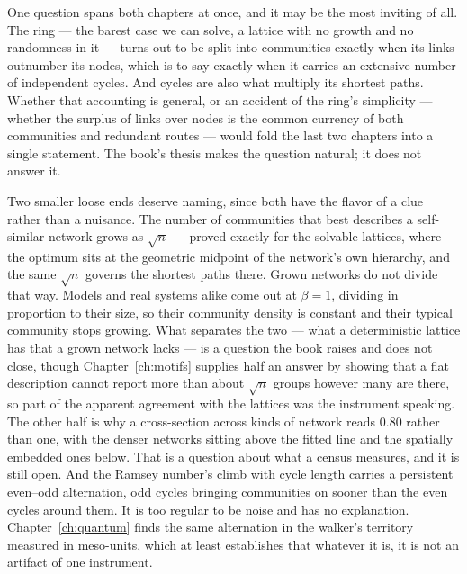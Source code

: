 One question spans both chapters at once, and it may be the most inviting of all.
The ring --- the barest case we can solve, a lattice with no growth and no
randomness in it --- turns out to be split into communities exactly when its links
outnumber its nodes, which is to say exactly when it carries an extensive number of
independent cycles. And cycles are also what multiply its shortest paths. Whether
that accounting is general, or an accident of the ring's simplicity --- whether the
surplus of links over nodes is the common currency of both communities and
redundant routes --- would fold the last two chapters into a single statement. The
book's thesis makes the question natural; it does not answer it.

Two smaller loose ends deserve naming, since both have the flavor of a clue rather
than a nuisance. The number of communities that best describes a self-similar network
grows as $\sqrt{n}$ --- proved exactly for the solvable lattices, where the optimum
sits at the geometric midpoint of the network's own hierarchy, and the same $\sqrt{n}$
governs the shortest paths there. Grown networks do not divide that way. Models and
real systems alike come out at $\beta=1$, dividing in proportion to their size, so
their community density is constant and their typical community stops growing. What
separates the two --- what a deterministic lattice has that a grown network lacks ---
is a question the book raises and does not close, though
Chapter~\ref{ch:motifs} supplies half an answer by showing that a flat description
cannot report more than about $\sqrt{n}$ groups however many are there, so part of the
apparent agreement with the lattices was the instrument speaking. The other half is why
a cross-section across kinds of network reads $0.80$ rather than one, with the denser
networks sitting above the fitted line and the spatially embedded ones below. That is a
question about what a census measures, and it is still open. And the Ramsey number's climb with cycle length
carries a persistent even--odd alternation, odd cycles bringing communities on
sooner than the even cycles around them. It is too regular to be noise and has no
explanation. Chapter~\ref{ch:quantum} finds the same alternation in the walker's
territory measured in meso-units, which at least establishes that whatever it is, it
is not an artifact of one instrument.

